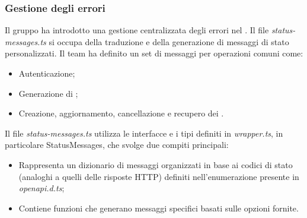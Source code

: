 \subsubsection{Gestione degli errori} \label{GestioneErrori}

\par Il gruppo ha introdotto una gestione centralizzata degli errori nel . Il file \textit{status-messages.ts} si occupa della traduzione e della generazione di messaggi di stato personalizzati. Il team ha definito un set di messaggi per operazioni comuni come:
\begin{itemize}
  \item Autenticazione;
  \item Generazione di ;
  \item Creazione, aggiornamento, cancellazione e recupero dei .
\end{itemize}

\vspace{0.5\baselineskip}
\par Il file \textit{status-messages.ts} utilizza le interfacce e i tipi definiti in \textit{wrapper.ts}, in particolare StatusMessages, che svolge due compiti principali:
\begin{itemize}
  \item Rappresenta un dizionario di messaggi organizzati in base ai codici di stato (analoghi a quelli delle risposte HTTP) definiti nell'enumerazione presente in \textit{openapi.d.ts};
  \item Contiene funzioni che generano messaggi specifici basati sulle opzioni fornite.
\end{itemize}